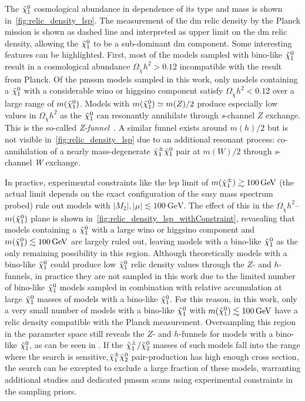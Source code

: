 The $\tilde{\chi}_1^0$ cosmological abundance in dependence of its type and mass is shown in~\cref{fig:relic_density_lsp}. The measurement of the \gls{dm} relic density by the Planck mission is shown as dashed line and interpreted as upper limit on the \gls{dm} relic density, allowing the $\tilde{\chi}_1^0$ to be a sub-dominant \gls{dm} component. Some interesting features can be highlighted. First, most of the models sampled with bino-like $\tilde{\chi}_1^0$ result in a cosmological abundance $\Omega_{\tilde{\chi}} h^2 > 0.12$ incompatible with the result from Planck. Of the \gls{pmssm} models sampled in this work, only models containing a $\tilde{\chi}_1^0$ with a considerable wino or higgsino component satisfy $\Omega_{\tilde{\chi}} h^2 < 0.12$ over a large range of $m(\tilde{\chi}_1^0)$. Models with $m(\tilde{\chi}_1^0) \simeq m(Z)/2$ produce especially low values in $\Omega_{\tilde{\chi}} h^2$ as the $\tilde{\chi}_1^0$ can resonantly annihilate through \textit{s}-channel $Z$ exchange. This is the so-called \textit{Z-funnel}~\cite{Cabrera:2016wwr}. A similar funnel exists around $m(h)/2$ but is not visible in~\cref{fig:relic_density_lsp} due to an additional resonant process: co-annihilation of a nearly mass-degenerate $\tilde{\chi}_1^\pm\tilde{\chi}_1^0$ pair at $m(W)/2$ through \textit{s}-channel \textit{W} exchange.

In practice, experimental constraints like \eg the \gls{lep} limit of $m(\charg) \gtrsim \SI{100}{\GeV}$ (the actual limit depends on the exact configuration of the \gls{susy} mass spectrum probed) rule out models with $\vert M_2\vert, \vert \mu \vert \lesssim \SI{100}{\GeV}$. The effect of this in the $\Omega_{\tilde{\chi}} h^2$--$m(\tilde{\chi}_1^0)$ plane is shown in~\cref{fig:relic_density_lsp_withConstraint}, revaealing that models containing a $\tilde{\chi}_1^0$ with a large wino or higgsino component and $m(\lsp) \lesssim \SI{100}{\GeV}$ are largely ruled out, leaving models with a bino-like $\tilde{\chi}_1^0$ as the only remaining possibility in this region. Although theoretically models with a bino-like $\tilde{\chi}_1^0$ could produce low $\tilde{\chi}_1^0$ relic density values through the $Z$- and $h$-funnels, in practice they are not sampled in this work due to the limited number of bino-like $\tilde{\chi}_1^0$ models sampled in combination with relative accumulation at large $\tilde{\chi}_1^0$ masses of models with a bino-like $\tilde{\chi}_1^0$. For this reason, in this work, only a very small number of models with a bino-like $\tilde{\chi}_1^0$ with $m(\lsp) \lesssim \SI{100}{\GeV}$ have a relic density compatible with the Planck measurement. Oversampling this region in the parameter space still reveals the $Z$- and $h$-funnels for models with a bino-like $\tilde{\chi}_1^0$, as can be seen in \eg {}\cite{pMSSM-scan-run1:2015baa,Aaboud:2016wna}. If the $\tilde{\chi}_1^\pm/\tilde{\chi}_2^0$ masses of such models fall into the range where the \onelepton search is sensitive,\ie $\tilde{\chi}_1^\pm\tilde{\chi}_2^0$ pair-production has high enough cross section, the \onelepton search can be excepted to exclude a large fraction of these models, warranting additional studies and dedicated \gls{pmssm} scans using experimental constraints in the sampling priors. 

